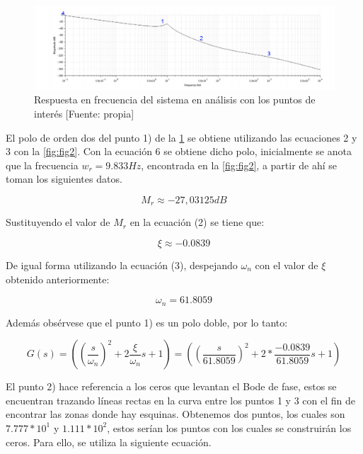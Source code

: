 \documentclass[12pt,letterpaper]{article}
\begin{document}
\begin{figure}[hbtp]
	\centering
	\includegraphics[width = \columnwidth]{diag3.jpg} 
	\caption[Figura3]{Respuesta en frecuencia del sistema en análisis con los puntos de interés [Fuente: propia]} 
	\label{fig3} 
\end{figure}

El polo de orden dos del punto 1) de la \ref{fig3} se obtiene utilizando las ecuaciones 2 y 3 con la \ref{fig:fig2}. Con la ecuación 6 se obtiene dicho polo, inicialmente se anota que la frecuencia $w_{r} = 9.833 Hz$, encontrada en la \ref{fig:fig2}, a partir de ahí se toman los siguientes datos.

\begin{equation*}
    M_r \approx -27,03125 dB
\end{equation*}

Sustituyendo el valor de $M_r$ en la ecuación (2) se tiene que:

\begin{equation*}
    \xi \approx -0.0839
\end{equation*}

De igual forma utilizando la ecuación (3), despejando $\omega_n$ con el valor de $\xi$ obtenido anteriormente:

\begin{equation*}
    \omega_n = 61.8059
\end{equation*}

\bigskip

Además obsérvese que el punto 1) es un polo doble, por lo tanto:

\begin{equation}
    G(s)= ((\frac{s}{\omega_n})^2 + 2\frac{\xi}{\omega_n}s +1) = ((\frac{s}{61.8059})^2 +2*\frac{-0.0839}{61.8059}s + 1)
\end{equation}


\bigskip

El punto 2) hace referencia a los ceros que levantan el Bode de fase, estos se encuentran trazando líneas rectas en la curva entre los puntos 1 y 3 con el fin de encontrar las zonas donde hay esquinas. Obtenemos dos puntos, los cuales son $7.777*10^1$ y $1.111*10^{2}$, estos serían los puntos con los cuales se construirán los ceros. Para ello, se utiliza la siguiente ecuación.
\end{document}

